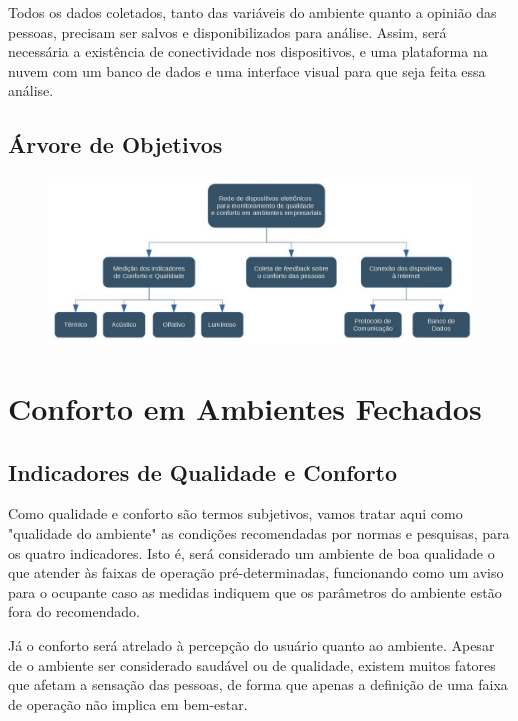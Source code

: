 \documentclass[]{politex}
\begin{document}
Todos os dados coletados, tanto das variáveis do ambiente quanto a opinião das pessoas, precisam ser salvos e disponibilizados para análise. Assim, será necessária a existência de conectividade nos dispositivos, e uma plataforma na nuvem com um banco de dados e uma interface visual para que seja feita essa análise. 

\chapter{Árvore de Objetivos} 

\begin{figure}[h]
\includegraphics[width=\textwidth]{objective_tree}
\end{figure}

\part{Conforto em Ambientes Fechados} %

\chapter{Indicadores de Qualidade e Conforto} %


Como qualidade e conforto são termos subjetivos, vamos tratar aqui como "qualidade do ambiente" as condições recomendadas por normas e pesquisas, para os quatro indicadores. Isto é, será considerado um ambiente de boa qualidade o que atender às faixas de operação pré-determinadas, funcionando como um aviso para o ocupante caso as medidas indiquem que os parâmetros do ambiente estão fora do recomendado. 

Já o conforto será atrelado à percepção do usuário quanto ao ambiente. Apesar de o ambiente ser considerado saudável ou de qualidade, existem muitos fatores que afetam a sensação das pessoas, de forma que apenas a definição de uma faixa de operação não implica em bem-estar. 
\end{document}
